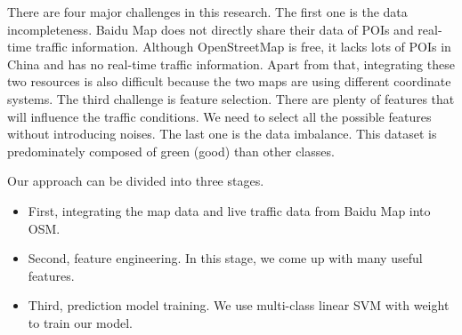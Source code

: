 There are four major challenges in this research. 
The first one is the data incompleteness. 
Baidu Map does not directly share their data of POIs and real-time traffic information. Although OpenStreetMap is free, it lacks lots of POIs in China and 
has no real-time traffic information. 
Apart from that, integrating these two resources is also difficult because the two maps are using different coordinate systems.
The third challenge is feature selection. There are plenty of features 
that will influence the traffic conditions. We need to select all the 
possible features without introducing noises. 
The last one
is the data imbalance. This dataset is predominately composed
of green (good) than other classes.

Our approach can be divided into three stages.
\begin{itemize}
\item First, integrating
the map data and live traffic data from Baidu Map into OSM. 

\item Second, feature engineering. In this stage, we come up with many useful features.

\item Third, prediction model training.
We use multi-class linear SVM with weight~\cite{multisvm} to train our model.

\end{itemize}



